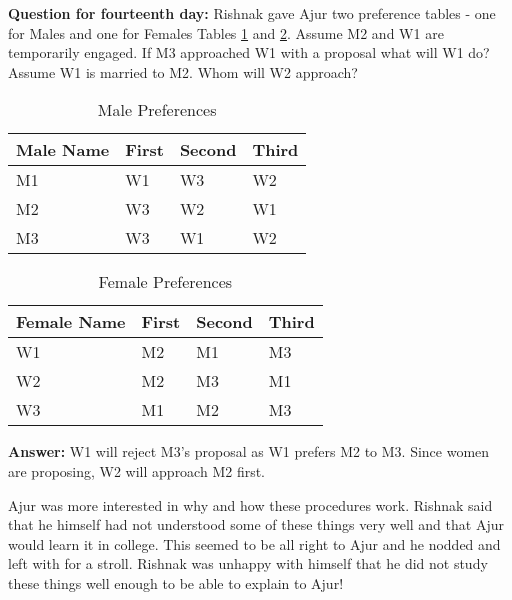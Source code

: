 \textbf{Question for fourteenth day:} Rishnak gave Ajur two preference tables - one for Males and one for Females Tables \ref{16tq1} and \ref{16tq2}. Assume M2 and W1 are temporarily engaged. If M3 approached W1 with a proposal what will W1 do? Assume W1 is married to M2. Whom will W2 approach? 

\begin{table}
\begin{center}
\begin{tabular}{ |p{3cm}||p{1.5cm}||p{1.5cm} || p{1.5cm}|| }
 \hline
 \hline
 Male Name & First&Second&Third\\
 \hline
 M1  & W1   &W3&W2\\
 M2&W3&W2&W1\\
M3&W3&W1&W2\\
 
 
 \hline
\end{tabular}
\caption{Male Preferences}\label{16tq1}
\end{center}
\end{table}
\begin{table}
\begin{center}
\begin{tabular}{ |p{3cm}||p{1.5cm}||p{1.5cm} || p{1.5cm}|| }
 \hline
 \hline
 Female Name & First&Second&Third\\
 \hline
 W1 & M2    &M1&M3\\
W2&M2&M3&M1\\
W3&M1&M2&M3\\
 
 
 \hline
\end{tabular}
\caption{Female Preferences}\label{16tq2}
\end{center}
\end{table}


\textbf{Answer:} W1 will reject M3's proposal as W1 prefers M2 to M3. Since women are proposing, W2 will approach M2 first.


Ajur was more interested in why and how these procedures work. Rishnak said that he himself had not understood some of these things very well and that Ajur would learn it in college. This seemed to be all right to Ajur and he nodded and left with for a stroll. Rishnak was unhappy with himself that he did not study these things well enough to be able to explain to Ajur! 

